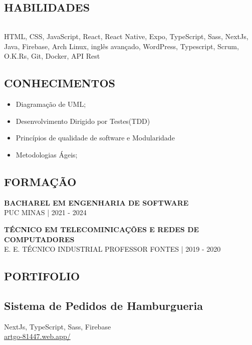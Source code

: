 \documentclass[a4paper]{article}
\begin{document}
\begin{multicols}{2}
\begin{framed}
    \section{HABILIDADES}
    \begin{tabular}{r|p{5cm}}
    \end{tabular}
    HTML, CSS, JavaScript, React, React Native, Expo, TypeScript, Sass,  NextJs, Java, Firebase, Arch Linux, inglês avançado, WordPress, Typescript, Scrum, O.K.Rs, Git, Docker, API Rest
  \end{framed}

  \begin{framed}
    \section{CONHECIMENTOS}
    \begin{itemize}
      \item Diagramação de UML;
      \item Desenvolvimento Dirigido por Testes(TDD)
      \item Princípios de qualidade de software e Modularidade
      \item Metodologias Ágeis;
    \end{itemize}
  \end{framed}

  \begin{framed}
    \section{FORMAÇÃO}

    \normalsize\textbf{BACHAREL EM ENGENHARIA DE SOFTWARE}\\
    \footnotesize{PUC MINAS | 2021 - 2024}

    \normalsize\textbf{TÉCNICO EM TELECOMINICAÇÕES E REDES DE COMPUTADORES}\\
    \footnotesize{E. E. TÉCNICO INDUSTRIAL PROFESSOR FONTES | 2019 - 2020}
  \end{framed}

  \begin{framed}
    \section{PORTIFOLIO}
      \small\subsection{Sistema de Pedidos de Hamburgueria}
      \footnotesize{NextJs, TypeScript, Sass, Firebase}\\
      \href{https://artgo-81447.web.app/}{artgo-81447.web.app/}


\end{framed}
\end{multicols}
\end{document}
